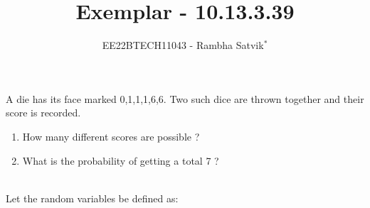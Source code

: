 \documentclass[journal,12pt,twocolumn]{IEEEtran}
\theoremstyle{remark}
\begin{document}

\vspace{3cm}

\title{Exemplar - 10.13.3.39}
\author{EE22BTECH11043 - Rambha Satvik$^{*}$%
}
\maketitle
\newpage
\bigskip

\renewcommand{\thefigure}{\theenumi}
\renewcommand{\thetable}{\theenumi}

A die has its face marked 0,1,1,1,6,6. Two such dice are thrown together and their score is recorded.
\begin{enumerate}
	\item How many different scores are possible ?
	\item What is the probability of getting a total 7 ?  
\end{enumerate}
\\
\solution
\fi
Let the random variables be defined as:
\begin{table}[!ht]
	
\end{table}
\end{document}
